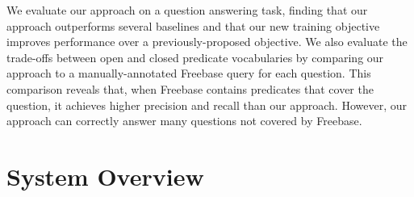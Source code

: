 \documentclass[11pt]{article}
\begin{document}
We evaluate our approach on a question answering task, finding that
our approach outperforms several baselines and that our new training
objective improves performance over a previously-proposed
objective. We also evaluate the trade-offs between open and closed
predicate vocabularies by comparing our approach to a
manually-annotated Freebase query for each question. This comparison
reveals that, when Freebase contains predicates that cover the
question, it achieves higher precision and recall than our
approach. However, our approach can correctly answer many questions
not covered by Freebase.

% 
% 




% 


\section{System Overview}
\end{document}
